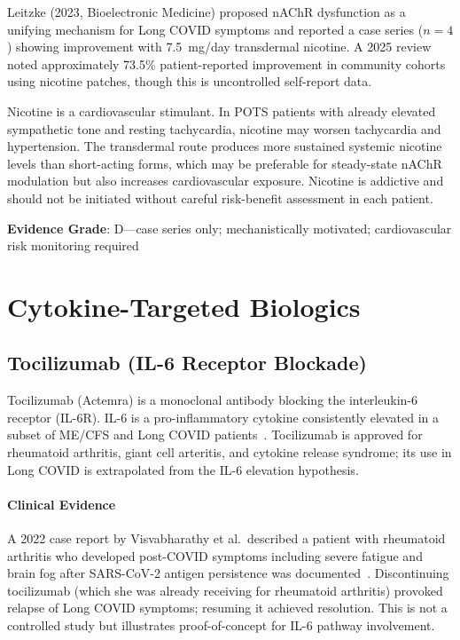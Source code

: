 Leitzke (2023, Bioelectronic Medicine) proposed nAChR dysfunction as a unifying mechanism for Long COVID symptoms and reported a case series ($n=4$) showing improvement with 7.5~mg/day transdermal nicotine. A 2025 review noted approximately 73.5\% patient-reported improvement in community cohorts using nicotine patches, though this is uncontrolled self-report data.

\begin{warning}
Nicotine is a cardiovascular stimulant. In POTS patients with already elevated sympathetic tone and resting tachycardia, nicotine may worsen tachycardia and hypertension. The transdermal route produces more sustained systemic nicotine levels than short-acting forms, which may be preferable for steady-state nAChR modulation but also increases cardiovascular exposure. Nicotine is addictive and should not be initiated without careful risk-benefit assessment in each patient.
\end{warning}

\textbf{Evidence Grade}: D---case series only; mechanistically motivated; cardiovascular risk monitoring required


\section{Cytokine-Targeted Biologics}
\label{sec:cytokine-targeted}

\subsection{Tocilizumab (IL-6 Receptor Blockade)}
\label{subsec:tocilizumab}

Tocilizumab (Actemra) is a monoclonal antibody blocking the interleukin-6 receptor (IL-6R). IL-6 is a pro-inflammatory cytokine consistently elevated in a subset of ME/CFS and Long COVID patients~\cite{Montoya2017cytokines}. Tocilizumab is approved for rheumatoid arthritis, giant cell arteritis, and cytokine release syndrome; its use in Long COVID is extrapolated from the IL-6 elevation hypothesis.

\paragraph{Clinical Evidence}

A 2022 case report by Visvabharathy et al.\ described a patient with rheumatoid arthritis who developed post-COVID symptoms including severe fatigue and brain fog after SARS-CoV-2 antigen persistence was documented~\cite{Visvabharathy2022tocilizumab}. Discontinuing tocilizumab (which she was already receiving for rheumatoid arthritis) provoked relapse of Long COVID symptoms; resuming it achieved resolution. This is not a controlled study but illustrates proof-of-concept for IL-6 pathway involvement.

